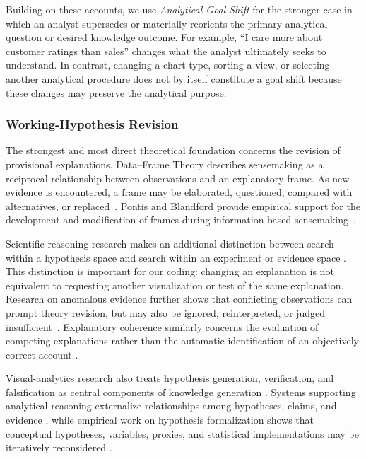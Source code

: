 \documentclass[journal]{IEEEtran}
\begin{document}
Building on these accounts, we use \emph{Analytical Goal Shift} for the
stronger case in which an analyst supersedes or materially reorients the
primary analytical question or desired knowledge outcome. For example,
``I care more about customer ratings than sales'' changes what the analyst
ultimately seeks to understand. In contrast, changing a chart type, sorting a
view, or selecting another analytical procedure does not by itself constitute
a goal shift because these changes may preserve the analytical purpose.

\subsubsection{Working-Hypothesis Revision}

The strongest and most direct theoretical foundation concerns the revision of
provisional explanations. Data--Frame Theory describes sensemaking as a
reciprocal relationship between observations and an explanatory frame. As new
evidence is encountered, a frame may be elaborated, questioned, compared with
alternatives, or replaced~\cite{klein2007dataframe}. Pontis and Blandford
provide empirical support for the development and modification of frames
during information-based sensemaking~\cite{pontis2016influence}.

Scientific-reasoning research makes an additional distinction between search
within a hypothesis space and search within an experiment or evidence space
\cite{klahr1988dual}. This distinction is important for our coding: changing
an explanation is not equivalent to requesting another visualization or test
of the same explanation. Research on anomalous evidence further shows that
conflicting observations can prompt theory revision, but may also be ignored,
reinterpreted, or judged insufficient~\cite{chinn1993anomalous}. Explanatory
coherence similarly concerns the evaluation of competing explanations rather
than the automatic identification of an objectively correct account
\cite{thagard1989explanatory}.

Visual-analytics research also treats hypothesis generation, verification,
and falsification as central components of knowledge generation
\cite{sacha2014knowledge}. Systems supporting analytical reasoning externalize
relationships among hypotheses, claims, and evidence
\cite{shrinivasan2008supporting}, while empirical work on hypothesis
formalization shows that conceptual hypotheses, variables, proxies, and
statistical implementations may be iteratively reconsidered
\cite{jun2022hypothesis}.
\end{document}
